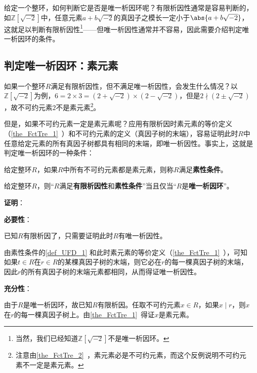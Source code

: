 给定一个整环，如何判断它是否是唯一析因环呢？有限析因性通常是容易判断的，如$\mathbb{Z}[\sqrt{-2}]$中，任意元素$a+b\sqrt{-2}$的真因子之模长一定小于$\abs{a+b\sqrt{-2}}$，这就足以判断有限析因性\footnote{当然，我们已经知道$\mathbb{Z}[\sqrt{-2}]$不是唯一析因环。}——但唯一析因性通常并不容易，因此需要介绍判定唯一析因环的条件。




\subsection{判定唯一析因环：素元素}



如果一个整环$R$满足有限析因性，但不满足唯一析因性，会发生什么情况？以$\mathbb{Z}[\sqrt{-2}]$为例，$6=2\times 3=(2+\sqrt{-2})\times(2-\sqrt{-2})$，但是$2\nmid(2\pm\sqrt{-2})$，故不可约元素$2$不是素元素\footnote{注意由\autoref{the_FctTre_2}~，素元素必是不可约元素，而这个反例说明不可约元素不一定是素元素。}。

但是，如果不可约元素一定是素元素呢？应用有限析因时素元素的等价定义（\autoref{the_FctTre_1}~）和不可约元素的定义（真因子树的末端），容易证明此时$R$中任意给定元素的所有真因子树都具有相同的末端，即唯一析因性。事实上，这就是判定唯一析因环的一种条件：



\begin{definition}{}\label{def_UFD_1}
给定整环$R$，如果$R$中所有不可约元素都是素元素，则称$R$满足\textbf{素性条件}。
\end{definition}


\begin{theorem}{}

给定整环$R$，则“$R$满足\textbf{有限析因性}和\textbf{素性条件}”当且仅当“$R$是\textbf{唯一析因环}”。

\end{theorem}


\textbf{证明}：

\textbf{必要性}：

已知$R$有限析因了，只需要证明此时$R$有唯一析因性。

由素性条件的\autoref{def_UFD_1}  和此时素元素的等价定义（\autoref{the_FctTre_1}~），可知如果$t\in R$在$r\in R$的某棵真因子树的末端，则它必在$r$的每一棵真因子树的末端，因此$r$的所有真因子树的末端元素都相同，从而得证唯一析因性。

\textbf{充分性}：

由于$R$是唯一析因环，故已知$R$有限析因。任取不可约元素$x\in R$，如果$x\mid r$，则$x$在$r$的每一棵真因子树上。由\autoref{the_FctTre_1}~得证$x$是素元素。

